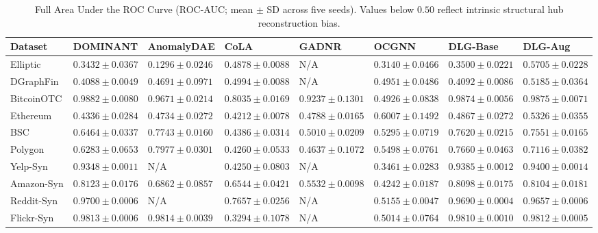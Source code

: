 \documentclass[applsci,article,submit,moreauthors,pdftex]{Definitions/mdpi}
\begin{document}
\renewcommand{\thetable}{A\arabic{table}}
\setcounter{table}{0}

\begin{table}[H]
\centering\scriptsize\setlength{\tabcolsep}{1.5pt}
\caption{Full Area Under the ROC Curve (ROC-AUC; mean $\pm$ SD across five seeds). Values below $0.50$ reflect intrinsic structural hub reconstruction bias.}
\label{tab:app_roc_auc_full}
\begin{tabularx}{\textwidth}{lXXXXXXX}\toprule
\textbf{Dataset} & \textbf{DOMINANT} & \textbf{AnomalyDAE} & \textbf{CoLA} & \textbf{GADNR} & \textbf{OCGNN} & \textbf{DLG-Base} & \textbf{DLG-Aug} \\\midrule
Elliptic & $0.3432 \pm 0.0367$ & $0.1296 \pm 0.0246$ & $0.4878 \pm 0.0088$ & N/A & $0.3140 \pm 0.0466$ & $0.3500 \pm 0.0221$ & $\mathbf{0.5705 \pm 0.0228}$ \\
DGraphFin & $0.4088 \pm 0.0049$ & $0.4691 \pm 0.0971$ & $0.4994 \pm 0.0088$ & N/A & $0.4951 \pm 0.0486$ & $0.4092 \pm 0.0086$ & $\mathbf{0.5185 \pm 0.0364}$ \\
BitcoinOTC & $\mathbf{0.9882 \pm 0.0080}$ & $0.9671 \pm 0.0214$ & $0.8035 \pm 0.0169$ & $0.9237 \pm 0.1301$ & $0.4926 \pm 0.0838$ & $0.9874 \pm 0.0056$ & $0.9875 \pm 0.0071$ \\
Ethereum & $0.4336 \pm 0.0284$ & $0.4734 \pm 0.0272$ & $0.4212 \pm 0.0078$ & $0.4788 \pm 0.0165$ & $\mathbf{0.6007 \pm 0.1492}$ & $0.4867 \pm 0.0272$ & $0.5326 \pm 0.0355$ \\
BSC & $0.6464 \pm 0.0337$ & $\mathbf{0.7743 \pm 0.0160}$ & $0.4386 \pm 0.0314$ & $0.5010 \pm 0.0209$ & $0.5295 \pm 0.0719$ & $0.7620 \pm 0.0215$ & $0.7551 \pm 0.0165$ \\
Polygon & $0.6283 \pm 0.0653$ & $\mathbf{0.7977 \pm 0.0301}$ & $0.4260 \pm 0.0533$ & $0.4637 \pm 0.1072$ & $0.5498 \pm 0.0761$ & $0.7660 \pm 0.0463$ & $0.7116 \pm 0.0382$ \\
Yelp-Syn & $0.9348 \pm 0.0011$ & N/A & $0.4250 \pm 0.0803$ & N/A & $0.3461 \pm 0.0283$ & $0.9385 \pm 0.0012$ & $\mathbf{0.9400 \pm 0.0014}$ \\
Amazon-Syn & $\mathbf{0.8123 \pm 0.0176}$ & $0.6862 \pm 0.0857$ & $0.6544 \pm 0.0421$ & $0.5532 \pm 0.0098$ & $0.4242 \pm 0.0187$ & $0.8098 \pm 0.0175$ & $0.8104 \pm 0.0181$ \\
Reddit-Syn & $\mathbf{0.9700 \pm 0.0006}$ & N/A & $0.7657 \pm 0.0256$ & N/A & $0.5155 \pm 0.0047$ & $0.9690 \pm 0.0004$ & $0.9657 \pm 0.0006$ \\
Flickr-Syn & $0.9813 \pm 0.0006$ & $\mathbf{0.9814 \pm 0.0039}$ & $0.3294 \pm 0.1078$ & N/A & $0.5014 \pm 0.0764$ & $0.9810 \pm 0.0010$ & $0.9812 \pm 0.0005$ \\

\end{tabularx}
\end{table}
\end{document}
